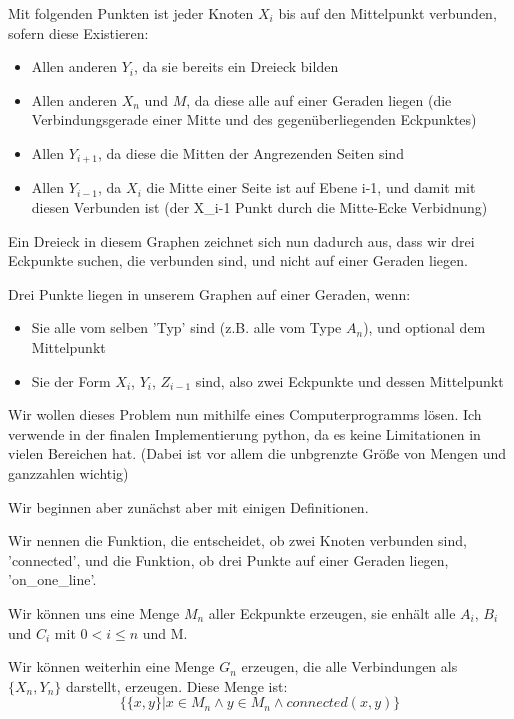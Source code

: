 \documentclass[11pt]{article}
\begin{document}
    Mit folgenden Punkten ist jeder Knoten $X_i$ bis auf den Mittelpunkt verbunden, sofern diese
    Existieren:

    \begin{itemize}
        \item Allen anderen $Y_i$, da sie bereits ein Dreieck bilden
        \item Allen anderen $X_n$ und $M$, da diese alle auf einer Geraden liegen (die Verbindungsgerade einer Mitte und des gegenüberliegenden Eckpunktes)
        \item Allen $Y_{i+1}$, da diese die Mitten der Angrezenden Seiten sind
        \item Allen $Y_{i-1}$, da $X_i$ die Mitte einer Seite ist auf Ebene i-1, und damit mit diesen Verbunden ist (der X_{i-1} Punkt durch die Mitte-Ecke Verbidnung)
    \end{itemize}

    \bigskip

    Ein Dreieck in diesem Graphen zeichnet sich nun dadurch aus, dass
    wir drei Eckpunkte suchen, die verbunden sind, und nicht auf einer Geraden liegen.

    Drei Punkte liegen in unserem Graphen auf einer Geraden, wenn:

    \begin{itemize}
        \item Sie alle vom selben 'Typ' sind (z.B. alle vom Type $A_n$), und optional dem Mittelpunkt
        \item Sie der Form $X_i$, $Y_i$, $Z_{i-1}$ sind, also zwei Eckpunkte und dessen Mittelpunkt
    \end{itemize}

    \newpage

    Wir wollen dieses Problem nun mithilfe eines Computerprogramms lösen.
    Ich verwende in der finalen Implementierung python, da es keine Limitationen in vielen Bereichen hat.
    (Dabei ist vor allem die unbgrenzte Größe von Mengen und ganzzahlen wichtig)

    Wir beginnen aber zunächst aber mit einigen Definitionen.

    Wir nennen die Funktion, die entscheidet, ob zwei Knoten verbunden sind, 'connected', und die Funktion,
    ob drei Punkte auf einer Geraden liegen, 'on\_one\_line'.

    Wir können uns eine Menge $M_n$ aller Eckpunkte erzeugen, sie enhält alle $A_i$, $B_i$ und $C_i$
    mit $0 < i \le n$ und M.

    Wir können weiterhin eine Menge $G_n$ erzeugen, die alle Verbindungen als $\{X_n, Y_n\}$ darstellt, erzeugen.
    Diese Menge ist:
    \[\{\{x, y\} \vert x \in M_n \land y \in M_n \land connected(x, y)\}\]
\end{document}
